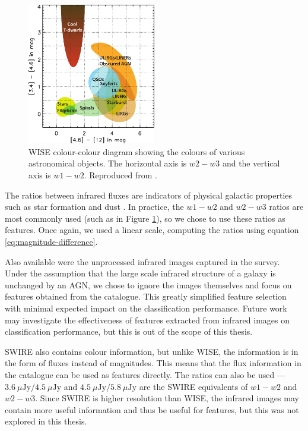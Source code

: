     \begin{figure}[!ht]
      \centering
      \includegraphics[width=0.5\textwidth]{images/wise_colour-colour}
      \caption{WISE colour-colour diagram showing the colours of various
        astronomical objects. The horizontal axis is $w2 - w3$ and the vertical
        axis is $w1 - w2$. Reproduced from \citep{wright10}.}
      \label{fig:wise-colour-colour}
    \end{figure}

    The ratios between infrared fluxes are indicators of physical galactic
    properties such as star formation and dust . In practice, the $w1 - w2$ and $w2 - w3$
    ratios are most commonly used (such as in Figure
    \ref{fig:wise-colour-colour}), so we chose to use these ratios as features.
    Once again, we used a linear scale, computing the ratios using equation
    \ref{eq:magnitude-difference}.

    Also available were the unprocessed infrared images captured in the survey.
    Under the assumption that the large scale infrared structure of a galaxy is
    unchanged by an AGN, we chose to ignore the images themselves and focus on
    features obtained from the catalogue. This greatly simplified feature
    selection with minimal expected impact on the classification performance.
    Future work may investigate the effectiveness of features extracted from
    infrared images on classification performance, but this is out of the scope
    of this thesis.

    SWIRE also contains colour information, but unlike WISE, the information is
    in the form of fluxes instead of magnitudes. This means that the flux
    information in the catalogue can be used as features directly. The ratios
    can also be used --- $3.6\ \mu\text{Jy} / 4.5\ \mu\text{Jy}$ and $4.5\
    \mu\text{Jy} / 5.8\ \mu\text{Jy}$ are the SWIRE equivalents of $w1 - w2$ and
    $w2 - w3$. Since SWIRE is higher resolution than WISE, the
    infrared images may contain more useful information and thus be useful for
    features, but this was not explored in this thesis.

